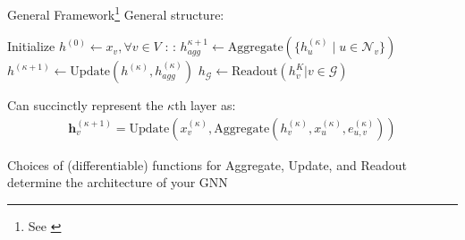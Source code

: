 \documentclass{beamer}
\newcommand{\nhood}{\mathcal{N}}
\newcommand{\Graph}{\mathcal{G}}
\newcommand{\NodeSet}{V}
\newcommand{\node}{v}
\newcommand{\nrepresent}{h}
\newcommand{\edge}{e}
\newcommand{\iter}{\kappa}
\newcommand{\Iter}{K}
\begin{document}
\begin{frame}{}
\begin{columns}[T]
\begin{column}{0.4\textwidth}
    \end{column}
    \begin{column}{0.3\textwidth}
    \end{column}
    \end{columns}

\end{frame}




\begin{frame}{
    General Framework\footnote{See \cite{ektefaie_multimodal_2023,xu_how_2019}}
    }
    General structure: 
    \begin{algorithmic}[1]
    \State Initialize $\nrepresent^{(0)} \gets x_\node, \forall \node \in \NodeSet$ 
        \For{$\iter = 0, ..., \Iter$}:
            \For{$\node \in \Graph$}:
            \State $\nrepresent_{agg}^{\iter+1} \gets \text{Aggregate}(\{h_u^{(\iter)} \mid u \in \nhood_\node\})$
            \State $\nrepresent^{(\iter+1)} \gets \text{Update}(\nrepresent^{(\iter)}, \nrepresent_{agg}^{(\iter)})$
            \EndFor
        \EndFor
        \State $h_\Graph \gets \text{Readout}(h^\Iter_\node | \node \in \Graph)$
    \end{algorithmic}

\vspace{4mm}

Can succinctly represent the $\iter$th layer as: 
\begin{gather*}
    \mathbf{h}_\node^{(\iter+1)} 
    =
    \text{Update}
    \left( 
    x_\node^{(\iter)}
    ,   
    \text{Aggregate}
    (
        h_\node^{(\iter)}, x_u^{(\iter)}, \edge_{u,\node}^{(\iter)}
    )
    \right)
\end{gather*}

\vspace{4mm}
Choices of (differentiable) functions for Aggregate, Update, and Readout determine the architecture of your GNN 
\end{frame}
\end{document}
